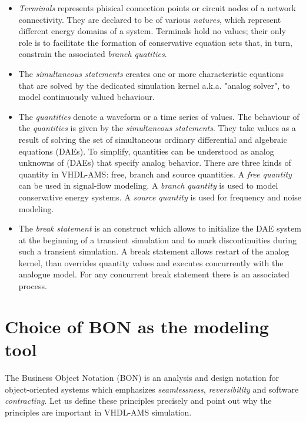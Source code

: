 \documentclass{article}
\begin{document}
\begin{itemize}
\item 
\emph{Terminals} represents phisical connection points or circuit nodes 
of a network connectivity. They are declared to be of various 
\emph{natures}, which represent different energy domains of a system.
Terminals hold no values; their only role is to facilitate the formation
of conservative equation sets that, in turn, constrain the associated 
\emph{branch quatities}. 
\item
The \emph{simultaneous statements} creates one or more characteristic 
equations that are solved by the dedicated simulation kernel a.k.a.
"analog solver", to model continuously valued behaviour.  
\item
The \emph{quantities} denote a waveform or a time series of values.
The behaviour of the \emph{quantities} is given by the \emph{simultaneous
 statements}. They take values as a result of solving the set of simultaneous 
ordinary differential and algebraic equations (DAEs). To simplify, 
quantities can be understood as analog unknowns of (DAEs) that specify 
analog behavior. There are three kinds of quantity in VHDL-AMS: free, 
branch and source quantities. A \emph{free quantity} can be used in 
signal-flow modeling. A \emph{branch quantity} is used to model conservative energy
systems. A \emph{source quantity} is used for frequency and noise modeling.
\item
The \emph{break statement} is an construct which allows to 
initialize the DAE system at the beginning of a transient 
simulation and to mark discontinuities during such a transient 
simulation. A break statement allows restart of the analog kernel,
than overrides quantity values and executes concurrently with the analogue model. 
For any concurrent break statement there is an associated process.
\end{itemize} 
 
\section{Choice of BON as the modeling tool}
The Business Object Notation (BON) is an analysis and design notation 
for object-oriented systems  which emphasizes \emph{seamlessness}, 
\emph{reversibility} and software \emph{contracting}. Let us define 
these principles precisely and point out why the principles are 
important in VHDL-AMS simulation.
\end{document}
